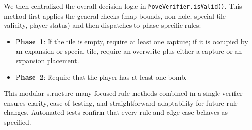 \noindent We then centralized the overall decision logic in \texttt{MoveVerifier.isValid()}. This method first applies the general checks (map bounds, non‐hole, special tile validity, player status) and then dispatches to phase‐specific rules:
\begin{itemize}
    \item \textbf{Phase 1}: If the tile is empty, require at least one capture; if it is occupied by an expansion or special tile, require an overwrite plus either a capture or an expansion placement.
    \item \textbf{Phase 2}: Require that the player has at least one bomb.
\end{itemize}

\noindent This modular structure many focused rule methods combined in a single verifier ensures clarity, ease of testing, and straightforward adaptability for future rule changes. Automated tests confirm that every rule and edge case behaves as specified.
